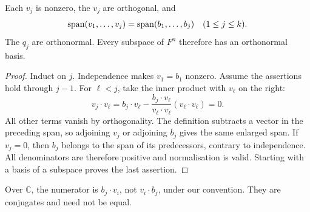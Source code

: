 \begin{theorem}
Each $v_j$ is nonzero, the $v_j$ are orthogonal, and
\[
 \operatorname{span}(v_1,\ldots,v_j)=\operatorname{span}(b_1,\ldots,b_j)
 \quad(1\leq j\leq k).
\]
The $q_j$ are orthonormal. Every subspace of $F^n$ therefore has an
orthonormal basis.
\end{theorem}
\begin{proof}
Induct on $j$. Independence makes $v_1=b_1$ nonzero.
Assume the assertions hold through $j-1$.
For $\ell<j$, take the inner product with $v_\ell$ on the right:
\[
 v_j\cdot v_\ell=b_j\cdot v_\ell
 -\frac{b_j\cdot v_\ell}{v_\ell\cdot v_\ell}
 (v_\ell\cdot v_\ell)=0.
\]
All other terms vanish by orthogonality.
The definition subtracts a vector in the preceding span, so adjoining
$v_j$ or adjoining $b_j$ gives the same enlarged span.
If $v_j=0$, then $b_j$ belongs to the span of its predecessors, contrary
to independence. All denominators are therefore positive and
normalisation is valid. Starting with a basis of a subspace proves the
last assertion.
\end{proof}

\begin{remark}
Over $\mathbb C$, the numerator is $b_j\cdot v_i$, not $v_i\cdot b_j$,
under our convention. They are conjugates and need not be equal.
\end{remark}

